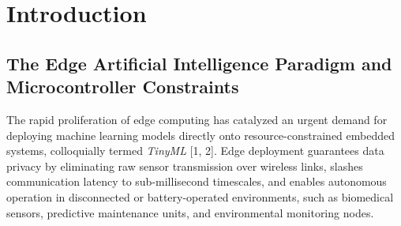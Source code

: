 \documentclass[11pt,a4paper]{article}
\begin{document}
\newpage
{}
\setcounter{page}{2}

\setcounter{tocdepth}{2}
\tableofcontents
\newpage

\section{Introduction}
\label{sec:introduction}

\subsection{The Edge Artificial Intelligence Paradigm and Microcontroller Constraints}
The rapid proliferation of edge computing has catalyzed an urgent demand for deploying machine learning models directly onto resource-constrained embedded systems, colloquially termed \textit{TinyML} [1, 2]. Edge deployment guarantees data privacy by eliminating raw sensor transmission over wireless links, slashes communication latency to sub-millisecond timescales, and enables autonomous operation in disconnected or battery-operated environments, such as biomedical sensors, predictive maintenance units, and environmental monitoring nodes.
\end{document}
